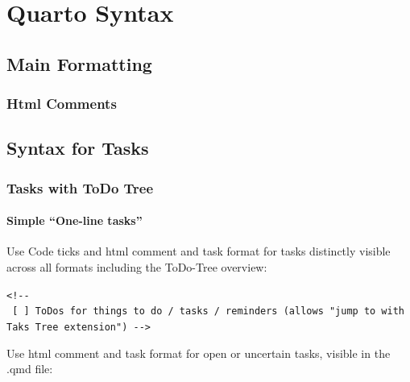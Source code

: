 \documentclass[
  11pt,
  letterpaper,
]{book}
\begin{document}


\chapter*{Quarto Syntax}\label{sec-syntax}


\section*{Main Formatting}\label{main-formatting}


\subsection*{Html Comments}\label{html-comments}

\section*{Syntax for Tasks}\label{syntax-for-tasks}


\subsection*{Tasks with ToDo Tree}\label{tasks-with-todo-tree}

\subsubsection*{Simple ``One-line tasks''}\label{simple-one-line-tasks}

Use Code ticks and html comment and task format for tasks distinctly
visible across all formats including the ToDo-Tree overview:

\texttt{\textless{}!-\/-\ {[}\ {]}\ ToDos\ for\ things\ to\ do\ /\ tasks\ /\ reminders\ (allows\ "jump\ to\ with\ Taks\ Tree\ extension")\ -\/-\textgreater{}}

Use html comment and task format for open or uncertain tasks, visible in
the .qmd file:
\end{document}
